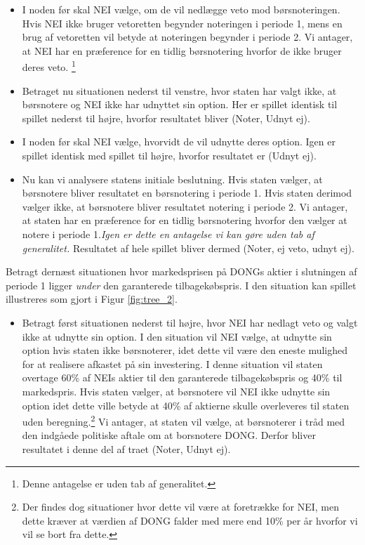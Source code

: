 \documentclass{article}
\begin{document}
\begin{appendices}
\begin{itemize}
			\item I noden før skal NEI vælge, om de vil nedlægge veto mod børsnoteringen. Hvis NEI ikke bruger vetoretten begynder noteringen i periode 1, mens en brug af vetoretten vil betyde at noteringen begynder i periode 2. Vi antager, at NEI har en præference for en tidlig børsnotering hvorfor de ikke bruger deres veto. \footnote{Denne antagelse er uden tab af generalitet.}
	
	\item Betraget nu situationen nederst til venstre, hvor staten har valgt ikke, at børsnotere og NEI ikke har udnyttet sin option. Her er spillet identisk til spillet nederst til højre, hvorfor resultatet bliver (Noter, Udnyt ej).
	
	\item I noden før skal NEI vælge, hvorvidt de vil udnytte deres option. Igen er spillet identisk med spillet til højre, hvorfor resultatet er (Udnyt ej). 
	
	\item Nu kan vi analysere statens initiale beslutning. Hvis staten vælger, at børsnotere bliver resultatet en børsnotering i periode 1. Hvis staten derimod vælger ikke, at børsnotere bliver resultatet notering i periode 2. Vi antager, at staten har en præference for en tidlig børsnotering hvorfor den vælger at notere i periode 1.\emph{Igen er dette en antagelse vi kan gøre uden tab af generalitet.} Resultatet af hele spillet bliver dermed (Noter, ej veto, udnyt ej).
 
\end{itemize}

Betragt dernæst situationen hvor markedsprisen på DONGs aktier i slutningen af periode 1 ligger \textit{under} den garanterede tilbagekøbspris. I den situation kan spillet illustreres som gjort i Figur \ref{fig:tree_2}.

\begin{itemize}

	\item Betragt først situationen nederst til højre, hvor NEI har nedlagt veto og valgt ikke at udnytte sin option. I den situation vil NEI vælge, at udnytte sin option hvis staten ikke børsnoterer, idet dette vil være den eneste mulighed for at realisere afkastet på sin investering. I denne situation vil staten overtage 60\% af NEIs aktier til den garanterede tilbagekøbspris og 40\% til markedspris. Hvis staten vælger, at børsnotere vil NEI ikke udnytte sin option idet dette ville betyde at 40\% af aktierne skulle overleveres til staten uden beregning.\footnote{Der findes dog situationer hvor dette vil være at foretrække for NEI, men dette kræver at værdien af DONG falder med mere end 10\% per år hvorfor vi vil se bort fra dette.} Vi antager, at staten vil vælge, at børsnoterer i tråd med den indgåede politiske aftale om at borsnotere DONG. Derfor bliver resultatet i denne del af traet (Noter, Udnyt ej).
	

\end{itemize}
\end{appendices}
\end{document}
